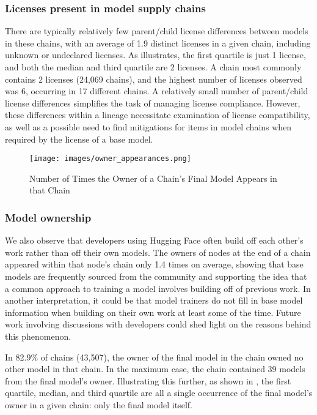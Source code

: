 \subsubsection{Licenses present in model supply chains}

There are typically relatively few parent/child license differences %
between models in these chains, with an average of 1.9 distinct licenses in a given chain, including unknown or undeclared licenses. As  illustrates, the first quartile is just 1 license, and both the median and third quartile are 2 licenses. %
A chain most commonly contains 2 licenses (24,069 chains), and the highest number of licenses observed was 6, occurring in 17 different chains. A relatively small number of parent/child license differences simplifies the task of managing license compliance. However, these differences within a lineage necessitate examination of license compatibility, as well as a possible need to find mitigations for items in model chains when required by the license of a base model. %

\begin{figure}[b]
\centering
\texttt{[image: images/owner\_appearances.png]}
\caption{Number of Times the Owner of a Chain's Final Model Appears in that Chain}
\label{fig:owner_appearances}
\end{figure}

\subsubsection{Model ownership}

We also observe that developers %
using Hugging Face often build off each other's work rather than off their own models. The owners of nodes at the end of a chain appeared within that node's chain only 1.4 times on average, showing that base models are frequently sourced from the community and supporting the idea that a common approach to training a model involves building off of previous work. In another interpretation, it could be that model trainers do not fill in base model information when building on their own work at least some of the time. Future work involving discussions with developers could shed light on the reasons behind this phenomenon. %

In 82.9\% of chains (43,507), the owner of the final model in the chain owned no other model in that chain. In the maximum case, the chain contained 39 models from the final model's owner. %
Illustrating this further, as shown in , the first quartile, median, and third quartile are all a single occurrence of the final model's owner in a given chain: only the final model itself. 






